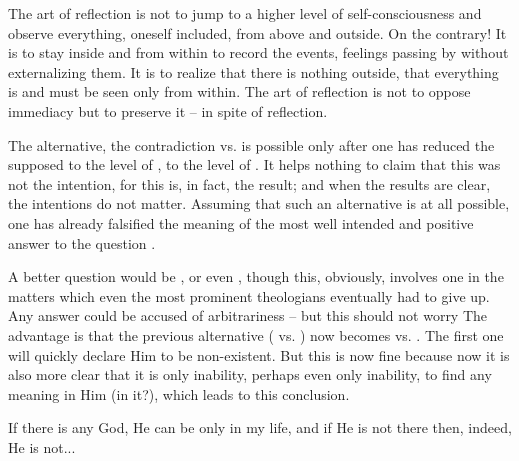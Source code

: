 The art of reflection is not to jump to a higher level of 
self-consciousness and observe everything, oneself included, from 
above and outside. On the contrary! It is to stay inside and from 
within to record the events, feelings passing by without externalizing 
them. It is to realize that there is nothing outside, that everything 
is and must be seen only from within. The art of reflection is not to 
oppose immediacy but to preserve it -- in spite of reflection.



The alternative, the contradiction  vs.  is
possible only after one has reduced the supposed  to the
level of , to the level of . It helps
nothing to claim that this was not the intention, for this is, in fact, the
result; and when the results are clear, the intentions do not matter. Assuming
that such an alternative is at all possible, one has already falsified the
meaning of the most well intended and positive answer to the 
question .

A better question would be , or even , though this, obviously, involves one in the matters which even the
most prominent theologians eventually had to give up. Any answer could be accused
of arbitrariness -- but this should not worry
The advantage is that the previous alternative ( vs. )
now becomes  vs. . The first one
will quickly declare Him to be non-existent. But this is now fine because now
it is also more clear that it is only inability, perhaps even only 
inability, to find any meaning in Him (in it?), which leads  to this
conclusion.

If there is any God, He can be only in my life, and if He is not there then,
indeed, He is not...




